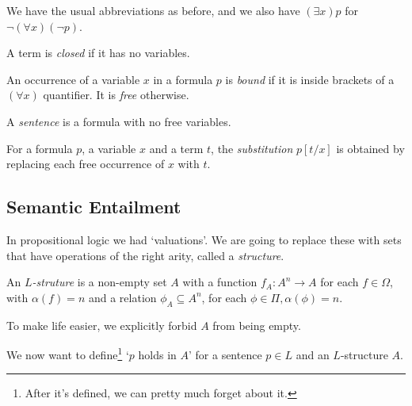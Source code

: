 \documentclass[a3paper, 10pt]{article}
\renewcommand{\vocab}[1]{\emph{#1}}
\begin{document}
\begin{multicols*}{5}
We have the usual abbreviations as before, and we also have $(\exists x) p$ for $\lnot (\forall x)(\lnot p)$.

\begin{definition}
  A term is \vocab{closed} if it has no variables.
\end{definition}

\begin{definition}
  An occurrence of a variable $x$ in a formula $p$ is \vocab{bound} if it is inside brackets of a $(\forall x)$ quantifier. It is \vocab{free} otherwise.
\end{definition}

\begin{definition}[Sentence]
  A \vocab{sentence} is a formula with no free variables.
\end{definition}

\begin{definition}[Substitution]
  For a formula $p$, a variable $x$ and a term $t$, the \vocab{substitution} $p[t/x]$ is obtained by replacing each free occurrence of $x$ with $t$.
\end{definition}

\subsection{Semantic Entailment}

In propositional logic we had `valuations'. We are going to replace these with sets that have operations of the right arity, called a \emph{structure}. 

\begin{definition}[Structure]
  An \vocab{$L$-struture} is a non-empty set $A$ with a function $f_A: A^n \rightarrow A$ for each $f \in \Omega$, with $\alpha(f) = n$ and a relation $\phi_A \subseteq A^n$, for each $\phi \in \Pi, \alpha(\phi) = n$.
\end{definition}

\begin{remark}
  To make life easier, we explicitly forbid $A$ from being empty. 
\end{remark}

We now want to define\footnote{After it's defined, we can pretty much forget about it.} `$p$ holds in $A$' for a sentence $p \in L$ and an $L$-structure $A$.


\end{multicols*}
\end{document}
